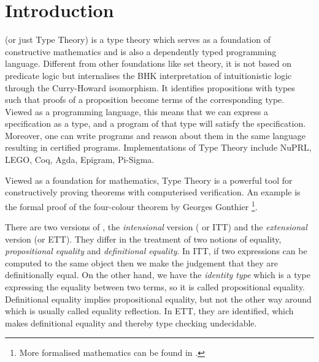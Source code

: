 \chapter{Introduction}

\mltt (or just Type Theory) is a type theory which serves as a
foundation of constructive mathematics and is also a dependently typed
programming language. Different from other foundations like set
theory, it is not based on predicate logic but internalises the BHK
interpretation of intuitionistic logic through the Curry-Howard
isomorphism. It identifies propositions with types such that proofs of
a proposition become terms of the corresponding type. Viewed as a
programming language, this means that we can express a specification
as a type, and a program of that type will satisfy the
specification. Moreover, one can write programs and reason about them
in the same language resulting in certified programs. Implementations
of Type Theory include NuPRL, LEGO, Coq, Agda, Epigram, Pi-Sigma.


Viewed as a foundation for mathematics, Type Theory is a powerful tool
for constructively proving theorems with computerised verification. An
example is the formal proof of the four-colour theorem by Georges
Gonthier \cite{gonthier08ams} \footnote{More formalised mathematics
  can be found in \cite{sbfm}.}.

There are two versions of \mltt, the \emph{intensional} version (\itt
or ITT) and the \emph{extensional} version (\ett or ETT).  They differ
in the treatment of two notions of equality, \emph{propositional
  equality} and \emph{definitional equality}.  In ITT, if two
expressions can be computed to the same object then we make the
judgement that they are definitionally equal. On the other hand, we
have the \emph{identity type} which is a type expressing the equality
between two terms, so it is called propositional
equality. Definitional equality implies propositional equality, but
not the other way around which is usually called equality reflection.
In ETT, they are identified, which makes definitional equality and
thereby type checking undecidable.


